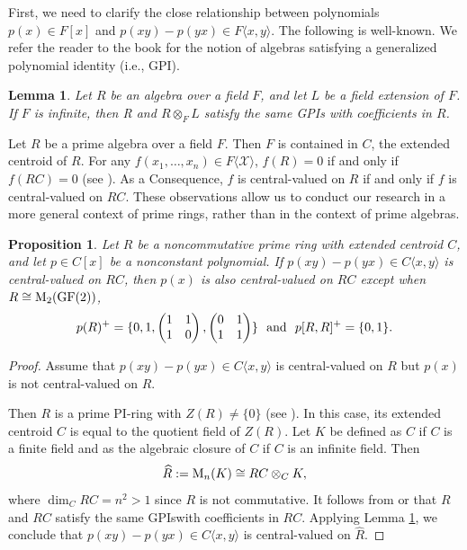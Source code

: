 \documentclass[11pt]{article}
\newtheorem{lemma}[theorem]{Lemma}
\newtheorem{proposition}[theorem]{Proposition}
\theoremstyle{definition}
\begin{document}
{{{{First, we need to clarify the close relationship between polynomials $p(x)\in F[x]$ and $p(xy)-p(yx)\in F\langle x, y \rangle$.
The following is well-known. We refer the reader to the book \cite{Bei_96} for the notion of algebras satisfying a generalized polynomial identity (i.e., GPI).

\begin{lemma}\label{lem5}
Let $R$ be an algebra over a field $F$, and let $L$ be a field extension of $F$. If $F$ is infinite, then R and
$R\otimes_FL$ satisfy the same GPIs with coefficients in $R$.
\end{lemma}

Let $R$ be a prime algebra over a field $F$. Then $F$ is contained in $C$, the extended centroid of $R$. For any $f(x_1,\ldots,x_n)\in F\langle\mathcal{X} \rangle$, $f(R)=0$ if and only if $f(RC)=0$ (see \cite[Theorem~2]{chuang1988}). As a Consequence, $f$ is central-valued on $R$ if and only if $f$ is central-valued on $RC$. These observations allow us to conduct our research in a more general context of prime rings, rather than in the context of prime algebras.

\begin{proposition}\label{pro4}
Let $R$ be a noncommutative prime ring with extended centroid $C$, and let $p \in C[x]$ be a nonconstant polynomial. If
$p(xy)-p(yx)\in C\langle x, y \rangle$ is central-valued on $RC$, then $p(x)$ is also central-valued on $RC$ except when $R\cong {\rm M}_2({\rm GF}(2))$,
					\[
	p(R)^+=\{0, 1, \begin{pmatrix}
						1 & 1 \\
						1 & 0
					\end{pmatrix}, \begin{pmatrix}
						0 & 1 \\
						1 & 1
					\end{pmatrix}\}\ \ \text{\rm and}\ \ p[R, R]^+=\{0, 1\}.
					\]
\end{proposition}

\begin{proof}
Assume that
$p(xy)-p(yx)\in C\langle x, y \rangle$ is central-valued on $R$ but $p(x)$ is not central-valued on $R$.

Then $R$ is a prime PI-ring with $Z(R)\ne \{0\}$ (see \cite[Theorem 2]{rowen1973}).
In this case, its extended centroid $C$ is equal to the quotient field of $Z(R)$. Let $K$ be defined as $C$ if $C$ is a finite field and as the algebraic closure of $C$ if $C$ is an infinite field. Then $$\widehat R:=\text{\rm M}_n(K)\cong RC\otimes_CK,$$ where $\dim_CRC=n^2>1$ since $R$ is not commutative.
It follows from \cite[Theorem 6.4.1]{Bei_96} or \cite[Theorem 2]{chuang1988} that $R$ and $RC$ satisfy the same GPIswith coefficients in $RC$. Applying Lemma \ref{lem5}, we conclude that $p(xy)-p(yx)\in C\langle x, y \rangle$ is central-valued on $\widehat R$.


\end{proof}}}}}
\end{document}

